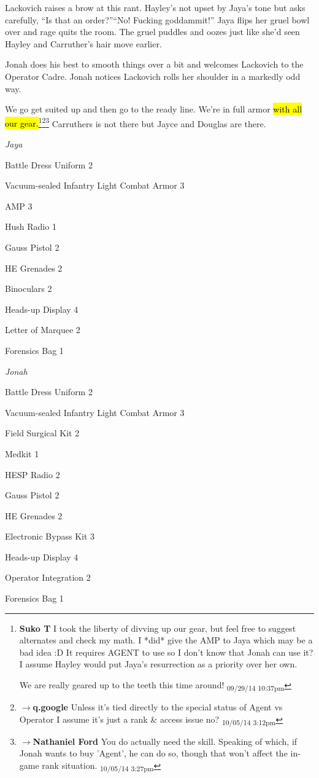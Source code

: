 Lackovich raises a brow at this rant.  Hayley's not upset by Jaya's tone but asks carefully, ``Is that an order?''``No!  Fucking goddammit!''  Jaya flips her gruel bowl over and rage quits the room. The gruel puddles and oozes just like she'd seen Hayley and Carruther's hair move earlier.

Jonah does his best to smooth things over a bit and welcomes Lackovich to the Operator Cadre.  Jonah notices Lackovich rolls her shoulder in a markedly odd way.





We go get suited up and then go to the ready line.  We're in full armor \hl{with all our gear.}\footnote{\textbf{Suko T }I took the liberty of divving up our gear, but feel free to suggest alternates and check my math.  I *did* give the AMP to Jaya which may be a bad idea :D  It requires AGENT to use so I don't know that Jonah can use it?  I assume Hayley would put Jaya's resurrection as a priority over her own.

We are really geared up to the teeth this time around! \textsubscript{09/29/14 10:37pm}}\footnote{$\rightarrow$\textbf{q.google }Unless it's tied directly to the special status of Agent vs Operator I assume it's just a rank \& access issue no? \textsubscript{10/05/14 3:12pm}}\footnote{$\rightarrow$\textbf{Nathaniel Ford }You do actually need the skill. Speaking of which, if Jonah wants to buy 'Agent', he can do so, though that won't affect the in-game rank situation. \textsubscript{10/05/14 3:27pm}}  Carruthers is not there but Jayce and Douglas are there.



\textit{Jaya}

{\parskip=0pt
Battle Dress Uniform 2

Vacuum-sealed Infantry Light Combat Armor 3

AMP 3

Hush Radio 1

Gauss Pistol 2

HE Grenades 2

Binoculars 2

Heads-up Display 4

Letter of Marquee 2

Forensics Bag 1
}


\textit{Jonah}

{\parskip=0pt
Battle Dress Uniform 2

Vacuum-sealed Infantry Light Combat Armor 3

Field Surgical Kit 2

Medkit 1

HESP Radio 2

Gauss Pistol 2

HE Grenades 2

Electronic Bypass Kit 3

Heads-up Display 4

Operator Integration 2

Forensics Bag 1
}


